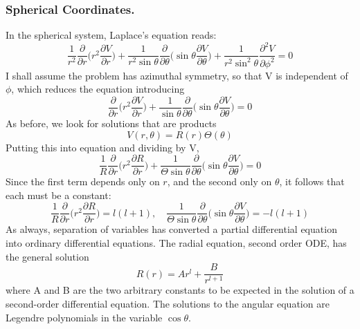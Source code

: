 \documentclass[../../../main.tex]{subfiles}
\begin{document}
\subsubsection*{Spherical Coordinates.} In the spherical system, Laplace's equation reads:
\begin{equation*}
    \frac{1}{r^2}\frac{\partial}{\partial r}\biggl(r^2\frac{\partial V}{\partial r}\biggr)+\frac{1}{r^2\sin\theta}\frac{\partial}{\partial \theta}\biggl(\sin\theta\frac{\partial V}{\partial \theta}\biggr)+\frac{1}{r^2\sin^2\theta}\frac{\partial^2 V}{\partial \phi^2}=0
\end{equation*}
I shall assume the problem has azimuthal symmetry, so that V is independent of $\phi$, which reduces the equation introducing
\begin{equation*}
    \frac{\partial}{\partial r}\biggl(r^2\frac{\partial V}{\partial r}\biggr)+\frac{1}{\sin\theta}\frac{\partial}{\partial \theta}\biggl(\sin\theta\frac{\partial V}{\partial \theta}\biggr)=0
\end{equation*}
As before, we look for solutions that are products
\begin{equation*}
    V (r, \theta) = R(r) \Theta(\theta)
\end{equation*}
Putting this into equation and dividing by V,
\begin{equation*}
    \frac{1}{R}\frac{\partial}{\partial r}\biggl(r^2\frac{\partial R}{\partial r}\biggr)+\frac{1}{\Theta\sin\theta}\frac{\partial}{\partial \theta}\biggl(\sin\theta\frac{\partial V}{\partial \theta}\biggr)=0
\end{equation*}
Since the first term depends only on $r$, and the second only on $\theta$, it follows that each must be a constant:
\begin{equation*}
    \frac{1}{R}\frac{\partial}{\partial r}\biggl(r^2\frac{\partial R}{\partial r}\biggr)=l(l+1),\quad \frac{1}{\Theta\sin\theta}\frac{\partial}{\partial \theta}\biggl(\sin\theta\frac{\partial V}{\partial \theta}\biggr)=-l(l+1)
\end{equation*}
As always, separation of variables has converted a partial differential equation into ordinary differential equations. The radial equation, second order ODE, has the general solution
\begin{equation*}
    R(r)=Ar^l+\frac{B}{r^{l+1}}
\end{equation*}
where A and B are the two arbitrary constants to be expected in the solution of a second-order differential equation. The solutions to the angular equation are Legendre polynomials in the variable $\cos \theta$.
\end{document}
